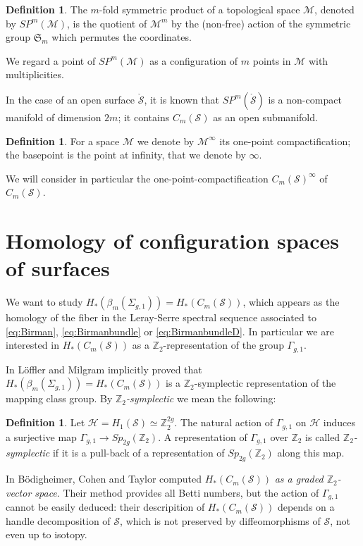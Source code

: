 \documentclass{amsart}
\theoremstyle{plain}
\theoremstyle{definition}
\newtheorem{defn}[thm]  {Definition}
\renewcommand{\H}{\mathcal{H}}
\renewcommand{\S}{\mathcal{S}}
\newcommand{\Z}{\mathbb{Z}}
\newcommand{\sg}{\Sigma_{g,1}}
\renewcommand{\gg}{\Gamma_{g,1}}
\newcommand{\bms}{\beta_{m}(\sg)}
\newcommand{\cms}{C_m(\S)}
\newcommand{\mrS}{\mathring{\S}}
\newcommand{\SP}{S\!P}
\begin{document}
\begin{defn}
 \label{defn:SP}
 The $m$-fold symmetric product of a topological space $\mathcal{M}$, denoted by $\SP^m(\mathcal{M})$, is
 the quotient of $\mathcal{M}^m$ by the (non-free) action of the symmetric group $\mathfrak{S}_m$
 which permutes the coordinates.
\end{defn}
We regard a point of $\SP^m(\mathcal{M})$ as a configuration of $m$ points in $\mathcal{M}$ with multiplicities.

In the case of an open surface $\mrS$, it is known that $\SP^m(\mrS)$ is a non-compact manifold of dimension $2m$;
it contains $\cms$ as an open submanifold.

\begin{defn}
 \label{defn:opc}
For a space $\mathcal{M}$ we denote by $\mathcal{M}^{\infty}$ its one-point
compactification; the basepoint is the point at infinity, that we denote by $\infty$.
\end{defn}


We will consider in particular the one-point-compactification $\cms^{\infty}$ of $\cms$.

\section{Homology of configuration spaces of surfaces}
\label{sec:HBraidSurf}
We want to study $H_*(\bms)=H_*(\cms)$,
which appears as the homology of the fiber
in the Leray-Serre spectral sequence associated to
\eqref{eq:Birman}, \eqref{eq:Birmanbundle} or \eqref{eq:BirmanbundleD}.
In particular we are interested in $H_*(C_m(\S))$
as a $\Z_2$-representation of the group $\gg$.

In \cite{LM} L\"offler and Milgram implicitly proved that $H_*(\bms)=H_*(\cms)$ is a $\Z_2$-symplectic
representation of the mapping class group. By \emph{$\Z_2$-symplectic} we mean the following:
\begin{defn}
 \label{defn:symplrep}
 Let $\H=H_1(\S)\simeq\Z_2^{2g}$.
 The natural action of $\gg$ on $\H$ induces a surjective map
 $\gg\to Sp_{2g}(\Z_2)$. A representation of $\gg$ over $\Z_2$ is called \emph{$\Z_2$-symplectic}
 if it is a pull-back of a representation of $Sp_{2g}(\Z_2)$ along this map.
\end{defn}

In \cite{BCT} B\"odigheimer, Cohen and Taylor computed $H_*(\cms)$ \emph{as a graded $\Z_2$-vector space}.
Their method provides all Betti numbers, but the action of $\gg$ cannot be easily deduced:
their descripition of $H_*(\cms)$ depends on a handle decomposition of $\S$, which is not preserved
by diffeomorphisms of $\S$, not even up to isotopy.
\end{document}
